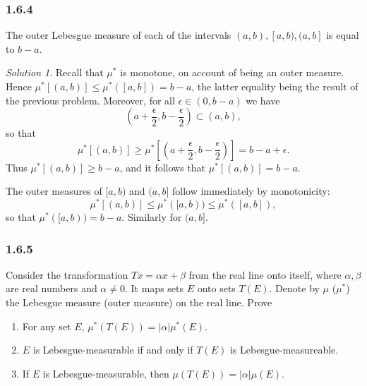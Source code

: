 \documentclass{report}
\theoremstyle{remark}
\newtheorem*{solution}{Solution}
\begin{document}
\subsubsection*{1.6.4}
The outer Lebesgue measure of each of the intervals $(a,b), [a,b), (a,b]$ is equal to $b-a$.

\begin{solution}
  Recall that $\mu^*$ is monotone, on account of being an outer measure. Hence $\mu^*[(a,b)] \le \mu^*([a,b]) = b - a$, the latter equality being the result of the previous problem. Moreover, for all $\epsilon \in (0, b-a)$ we have
  \begin{equation*}
    \left( a + \frac{\epsilon}{2}, b - \frac{\epsilon}{2} \right) \subset (a,b),
  \end{equation*}
  so that
  \begin{equation*}
    \mu^*[(a,b)] \ge \mu^* \left[ \left( a + \frac{\epsilon}{2}, b - \frac{\epsilon}{2} \right) \right] = b - a + \epsilon.
  \end{equation*}
  Thus $\mu^*[(a,b)] \ge b - a$, and it follows that $\mu^*[(a,b)] = b - a$.

  The outer measures of $[a,b)$ and $(a,b]$ follow immediately by monotonicity:
  \begin{equation*}
    \mu^*[(a,b)] \le \mu^*([a,b)) \le \mu^*([a,b]),
  \end{equation*}
  so that $\mu^*([a,b)) = b - a$. Similarly for $(a,b]$.
\end{solution}

\subsubsection*{1.6.5}
Consider the transformation $T x = \alpha x + \beta$ from the real line onto itself, where $\alpha, \beta$ are real numbers and $\alpha \ne 0$. It maps sets $E$ onto sets $T(E)$. Denote by $\mu$ ($\mu^*$) the Lebesgue measure (outer measure) on the real line. Prove
\begin{enumerate}[label=(\alph*)]
  \item For any set $E$, $\mu^*(T(E)) = |\alpha| \mu^*(E)$.
  \item $E$ is Lebesgue-measurable if and only if $T(E)$ is Lebesgue-measureable.
  \item If $E$ is Lebesgue-measurable, then $\mu(T(E)) = |\alpha| \mu(E)$.
\end{enumerate}
\end{document}
